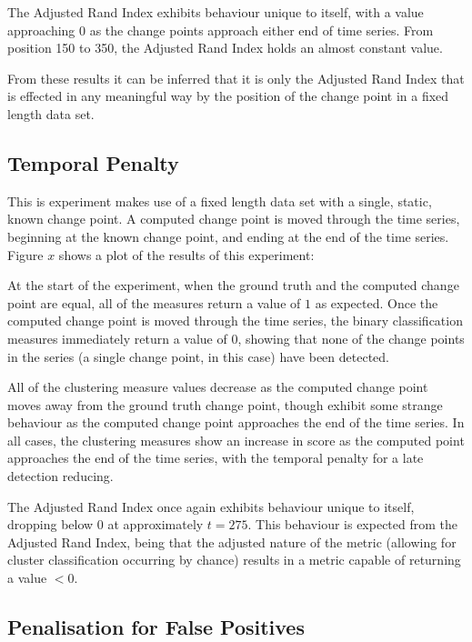 \documentclass{uvamscse}	%
\begin{document}
The Adjusted Rand Index exhibits behaviour unique to itself, with a value approaching 0 as the change points approach either end of time series. From position 150 to 350, the Adjusted Rand Index holds an almost constant value.

From these results it can be inferred that it is only the Adjusted Rand Index that is effected in any meaningful way by the position of the change point in a fixed length data set.

\subsection{Temporal Penalty}

This is experiment makes use of a fixed length data set with a single, static, known change point. A computed change point is moved through the time series, beginning at the known change point, and ending at the end of the time series. Figure $x$ shows a plot of the results of this experiment:


At the start of the experiment, when the ground truth and the computed change point are equal, all of the measures return a value of $1$ as expected. Once the computed change point is moved through the time series, the binary classification measures immediately return a value of $0$, showing that none of the change points in the series (a single change point, in this case) have been detected.

All of the clustering measure values decrease as the computed change point moves away from the ground truth change point, though exhibit some strange behaviour as the computed change point approaches the end of the time series. In all cases, the clustering measures show an increase in score as the computed point approaches the end of the time series, with the temporal penalty for a late detection reducing.

The Adjusted Rand Index once again exhibits behaviour unique to itself, dropping below $0$ at approximately  $t=275$. This behaviour is expected from the Adjusted Rand Index, being that the adjusted nature of the metric (allowing for cluster classification occurring by chance) results in a metric capable of returning a value $<0$.

\subsection{Penalisation for False Positives}
\end{document}
